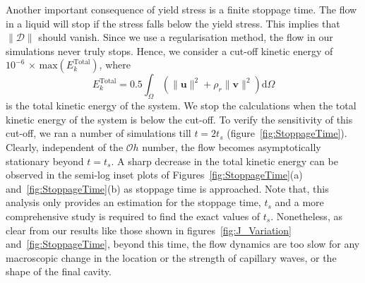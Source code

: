 \documentclass[final]{jfm}
\begin{document}
Another important consequence of yield stress is a finite stoppage time. The flow in a liquid will stop if the stress falls below the yield stress. This implies that $\|\boldsymbol{\mathcal{D}}\|$ should vanish. Since we use a regularisation method, the flow in our simulations never truly stops. Hence, we consider a cut-off kinetic energy of $10^{-6}\,\times\,\text{max}(E_k^\text{Total})$, where
\begin{equation}\label{Eqn::E_kTotal}
	E_k^\text{Total} = 0.5\int_\Omega\left(\|\boldsymbol{u}\|^2 + \rho_r\|\boldsymbol{v}\|^2\right)\mathrm{d}\Omega
\end{equation}
is the total kinetic energy of the system. We stop the calculations when the total kinetic energy of the system is below the cut-off. To verify the sensitivity of this cut-off, we ran a number of simulations till $t = 2t_s$ (figure~\ref{fig:StoppageTime}). Clearly, independent of the $\mathcal{O}h$ number, the flow becomes asymptotically stationary beyond $t = t_s$. A sharp decrease in the total kinetic energy can be observed in the semi-log inset plots of Figures~\ref{fig:StoppageTime}(a) and~\ref{fig:StoppageTime}(b) as stoppage time is approached. Note that, this analysis only provides an estimation for the stoppage time, $t_s$ and a more comprehensive study is required to find the exact values of $t_s$. Nonetheless, as clear from our results like those shown in  figures~\ref{fig:J_Variation} and~\ref{fig:StoppageTime}, beyond this time, the flow dynamics are too slow for any macroscopic change in the location or the strength of capillary waves, or the shape of the final cavity.
\end{document}
